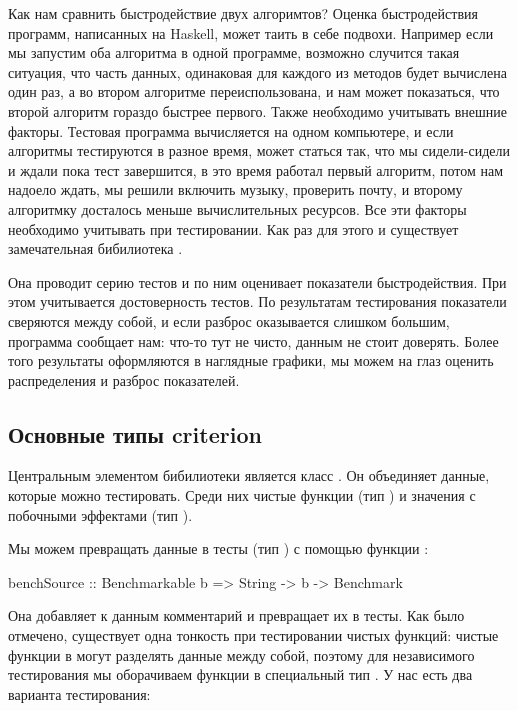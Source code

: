 Как нам сравнить быстродействие двух алгоримтов? Оценка быстродействия
программ, написанных на Haskell, может таить в себе подвохи. Например
если мы запустим оба алгоритма в одной программе, возможно случится
такая ситуация, что часть данных, одинаковая для каждого из методов
будет вычислена один раз, а во втором алгоритме переиспользована, и нам
может показаться, что второй алгоритм гораздо быстрее первого. Также
необходимо учитывать внешние факторы. Тестовая программа вычисляется на
одном компьютере, и если алгоритмы тестируются в разное время, может
статься так, что мы сидели-сидели и ждали пока тест завершится, в это
время работал первый алгоритм, потом нам надоело ждать, мы решили
включить музыку, проверить почту, и второму алгоритмку досталось меньше
вычислительных ресурсов. Все эти факторы необходимо учитывать при
тестировании. Как раз для этого и существует замечательная бибилиотека
.

Она проводит серию тестов и по ним оценивает показатели быстродействия.
При этом учитывается достоверность тестов. По результатам тестирования
показатели сверяются между собой, и если разброс оказывается слишком
большим, программа сообщает нам: что-то тут не чисто, данным не стоит
доверять. Более того результаты оформляются в наглядные графики, мы
можем на глаз оценить распределения и разброс показателей.

\subsection{Основные типы criterion}

Центральным элементом бибилиотеки является класс . Он
объединяет данные, которые можно тестировать. Среди них чистые функции
(тип ) и значения с побочными эффектами (тип ).

Мы можем превращать данные в тесты (тип ) с помощью
функции :


\begin{code}
benchSource :: Benchmarkable b => String -> b -> Benchmark
\end{code}

Она добавляет к данным комментарий и превращает их в тесты. Как было
отмечено, существует одна тонкость при тестировании чистых функций:
чистые функции в  могут разделять данные между собой,
поэтому для независимого тестирования мы оборачиваем функции в
специальный тип . У нас есть два варианта тестирования:

